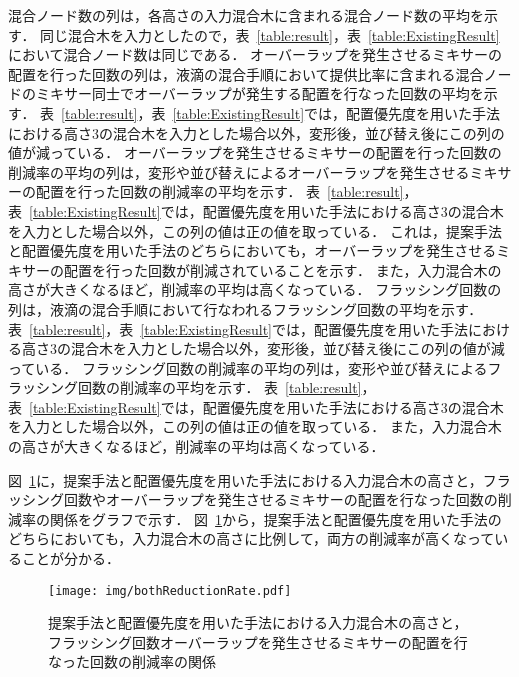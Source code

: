 混合ノード数の列は，各高さの入力混合木に含まれる混合ノード数の平均を示す．
同じ混合木を入力としたので，表~\ref{table:result}，表~\ref{table:ExistingResult}において混合ノード数は同じである．
オーバーラップを発生させるミキサーの配置を行った回数の列は，液滴の混合手順において提供比率に含まれる混合ノードのミキサー同士でオーバーラップが発生する配置を行なった回数の平均を示す．
表~\ref{table:result}，表~\ref{table:ExistingResult}では，配置優先度を用いた手法における高さ3の混合木を入力とした場合以外，変形後，並び替え後にこの列の値が減っている．
オーバーラップを発生させるミキサーの配置を行った回数の削減率の平均の列は，変形や並び替えによるオーバーラップを発生させるミキサーの配置を行った回数の削減率の平均を示す．
表~\ref{table:result}，表~\ref{table:ExistingResult}では，配置優先度を用いた手法における高さ3の混合木を入力とした場合以外，この列の値は正の値を取っている．
これは，提案手法と配置優先度を用いた手法のどちらにおいても，オーバーラップを発生させるミキサーの配置を行った回数が削減されていることを示す．
また，入力混合木の高さが大きくなるほど，削減率の平均は高くなっている．
フラッシング回数の列は，液滴の混合手順において行なわれるフラッシング回数の平均を示す．
表~\ref{table:result}，表~\ref{table:ExistingResult}では，配置優先度を用いた手法における高さ3の混合木を入力とした場合以外，変形後，並び替え後にこの列の値が減っている．
フラッシング回数の削減率の平均の列は，変形や並び替えによるフラッシング回数の削減率の平均を示す．
表~\ref{table:result}，表~\ref{table:ExistingResult}では，配置優先度を用いた手法における高さ3の混合木を入力とした場合以外，この列の値は正の値を取っている．
また，入力混合木の高さが大きくなるほど，削減率の平均は高くなっている．

図~\ref{fig:FlushingReductionRate}に，提案手法と配置優先度を用いた手法における入力混合木の高さと，フラッシング回数やオーバーラップを発生させるミキサーの配置を行なった回数の削減率の関係をグラフで示す．
図~\ref{fig:FlushingReductionRate}から，提案手法と配置優先度を用いた手法のどちらにおいても，入力混合木の高さに比例して，両方の削減率が高くなっていることが分かる．

\begin{figure}[tbp]
 \centering\texttt{[image: img/bothReductionRate.pdf]}

    \caption{提案手法と配置優先度を用いた手法における入力混合木の高さと，フラッシング回数オーバーラップを発生させるミキサーの配置を行なった回数の削減率の関係}

    \label{fig:FlushingReductionRate}
\end{figure}

